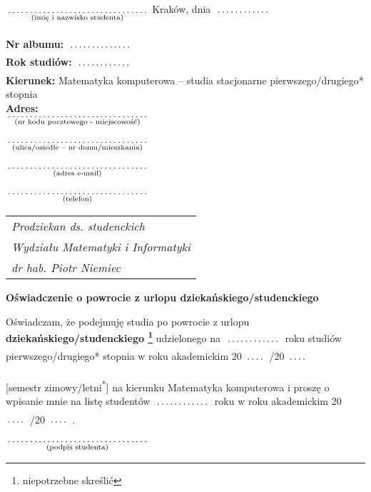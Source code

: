 \documentclass[a4paper,11pt]{article}
\newcommand{\fillField}[2]{
    $\underset{\text{#1}}{\parbox[t]{#2}{\dotfill}}$
}
\begin{document}
\noindent
\fillField{(imię i nazwisko studenta)}{5cm} \hfill Kraków, dnia \fillField{}{2cm} \\\\
\textbf{Nr albumu:}   \fillField{}{2.3cm}\\
\textbf{Rok studiów:} \fillField{}{2cm}\\
\textbf{Kierunek:} Matematyka komputerowa – studia stacjonarne pierwszego/drugiego* stopnia\\
\textbf{Adres:}\\
\fillField{(nr kodu pocztowego - miejscowość)}{5cm}\\\\
\fillField{(ulica/osiedle – nr domu/mieszkania)}{5cm}\\\\
\fillField{(adres e-mail)}{5cm}\\\\
\fillField{(telefon)}{5cm}


\phantom{a}\hfill
\begin{tabular}[c]{@{}l@{}}
\textit{Prodziekan ds. studenckich} \\
\textit{Wydziału Matematyki i Informatyki}\\
\textit{dr hab. Piotr Niemiec}
\end{tabular}

\vskip 2.0cm

\begin{center}
{\Large \textbf{Oświadczenie o powrocie z urlopu dziekańskiego/studenckiego}}
\end{center}

\vskip 0.5cm

Oświadczam, że podejmuję studia po powrocie z urlopu \textbf{dziekańskiego/studenckiego
\footnote[1]{niepotrzebne skreślić}} udzielonego na \fillField{}{2cm} roku studiów
pierwszego/drugiego* stopnia w roku akademickim 20\fillField{}{0.7cm}/20\fillField{}{0.7cm}
[semestr zimowy/letni\textsuperscript{*}] na kierunku Matematyka komputerowa i proszę o wpisanie
mnie na listę studentów \fillField{}{2cm} roku w roku
akademickim 20\fillField{}{0.7cm}/20\fillField{}{0.7cm}.

\vskip 2.0cm

\hspace{\fill} \fillField{(podpis studenta)}{5cm} \hspace{2.0cm}
\end{document}
